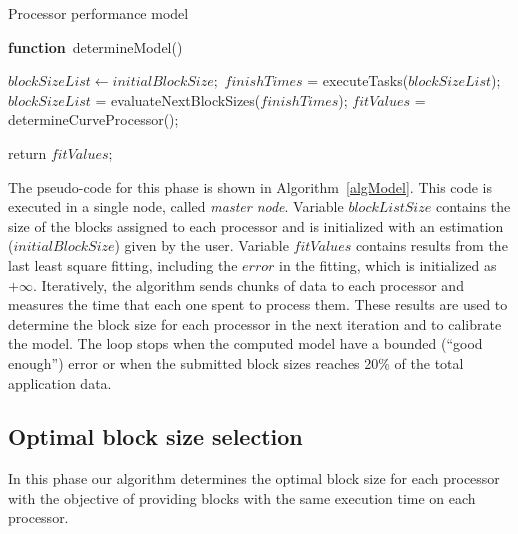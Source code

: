 \documentclass[journal]{IEEEtran}
\begin{document}


\begin{algorithm}

\caption{Processor performance model}
\label{algModel}

\begin{algorithmic}		

\STATE \textbf{function}~determineModel()

\STATE $blockSizeList \leftarrow initialBlockSize;$
		\STATE $finishTimes$ = executeTasks($blockSizeList$);
	        \STATE $blockSizeList$ = evaluateNextBlockSizes($finishTimes$);
		\STATE $fitValues$ = determineCurveProcessor();
\ENDWHILE

return $fitValues$;

\end{algorithmic}
\end{algorithm}


The pseudo-code for this phase is shown in Algorithm~\ref{algModel}. This code
is executed in a single node, called \emph{master node}. Variable
$blockListSize$ contains the size of the blocks assigned to each processor and
is initialized with an estimation ($initialBlockSize$) given by the
user. Variable $fitValues$ contains results from the last least square fitting,
including the $error$ in the fitting, which is initialized as
$+\infty$. Iteratively, the algorithm sends chunks of data to each processor and
measures the time that each one spent to process them.  These results are used
to determine the block size for each processor in the next iteration and to
calibrate the model. The loop stops when the computed model have a bounded
(``good enough'') error or when the submitted block sizes reaches 20\% of the
total application data.

\subsection{Optimal block size selection}
In this phase our algorithm determines 
the optimal block size for each processor with the objective of providing blocks
with the same execution time on each processor.
\end{document}
